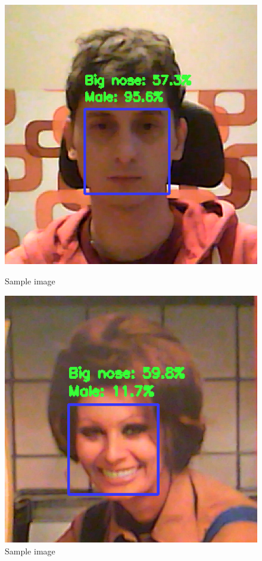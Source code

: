 \documentclass{article}
\begin{document}
\begin{figure}[ht]
    \centering
    \begin{minipage}{0.45\linewidth}
        \centering
        \includegraphics[width=\linewidth]{faceTest_camera_1.png}
        \caption{Sample image}
        \label{fig:first}
    \end{minipage}
    \hfill
    \begin{minipage}{0.45\linewidth}
        \centering
        \includegraphics[width=\linewidth]{faceTest_camera_2.png}
        \caption{Sample image}
        \label{fig:first}
    \end{minipage}
    \label{fig:side-by-side}
\end{figure}
\end{document}
